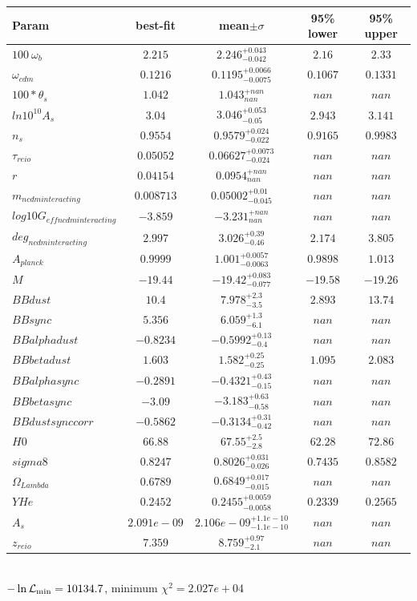 \begin{tabular}{|l|c|c|c|c|} 
 \hline 
Param & best-fit & mean$\pm\sigma$ & 95\% lower & 95\% upper \\ \hline 
$100~\omega{}_{b }$ &$2.215$ & $2.246_{-0.042}^{+0.043}$ & $2.16$ & $2.33$ \\ 
$\omega{}_{cdm }$ &$0.1216$ & $0.1195_{-0.0075}^{+0.0066}$ & $0.1067$ & $0.1331$ \\ 
$100*\theta{}_{s }$ &$1.042$ & $1.043_{nan}^{+nan}$ & $nan$ & $nan$ \\ 
$ln10^{10}A_{s }$ &$3.04$ & $3.046_{-0.05}^{+0.053}$ & $2.943$ & $3.141$ \\ 
$n_{s }$ &$0.9554$ & $0.9579_{-0.022}^{+0.024}$ & $0.9165$ & $0.9983$ \\ 
$\tau{}_{reio }$ &$0.05052$ & $0.06627_{-0.024}^{+0.0073}$ & $nan$ & $nan$ \\ 
$r$ &$0.04154$ & $0.0954_{nan}^{+nan}$ & $nan$ & $nan$ \\ 
$m_{ncdm interacting }$ &$0.008713$ & $0.05002_{-0.045}^{+0.01}$ & $nan$ & $nan$ \\ 
$log10G_{eff ncdm interacting }$ &$-3.859$ & $-3.231_{nan}^{+nan}$ & $nan$ & $nan$ \\ 
$deg_{ncdm interacting }$ &$2.997$ & $3.026_{-0.46}^{+0.39}$ & $2.174$ & $3.805$ \\ 
$A_{planck }$ &$0.9999$ & $1.001_{-0.0063}^{+0.0057}$ & $0.9898$ & $1.013$ \\ 
$M$ &$-19.44$ & $-19.42_{-0.077}^{+0.083}$ & $-19.58$ & $-19.26$ \\ 
$BBdust$ &$10.4$ & $7.978_{-3.5}^{+2.3}$ & $2.893$ & $13.74$ \\ 
$BBsync$ &$5.356$ & $6.059_{-6.1}^{+1.3}$ & $nan$ & $nan$ \\ 
$BBalphadust$ &$-0.8234$ & $-0.5992_{-0.4}^{+0.13}$ & $nan$ & $nan$ \\ 
$BBbetadust$ &$1.603$ & $1.582_{-0.25}^{+0.25}$ & $1.095$ & $2.083$ \\ 
$BBalphasync$ &$-0.2891$ & $-0.4321_{-0.15}^{+0.43}$ & $nan$ & $nan$ \\ 
$BBbetasync$ &$-3.09$ & $-3.183_{-0.58}^{+0.63}$ & $nan$ & $nan$ \\ 
$BBdustsynccorr$ &$-0.5862$ & $-0.3134_{-0.42}^{+0.31}$ & $nan$ & $nan$ \\ 
$H0$ &$66.88$ & $67.55_{-2.8}^{+2.5}$ & $62.28$ & $72.86$ \\ 
$sigma8$ &$0.8247$ & $0.8026_{-0.026}^{+0.031}$ & $0.7435$ & $0.8582$ \\ 
$\Omega{}_{Lambda }$ &$0.6789$ & $0.6849_{-0.015}^{+0.017}$ & $nan$ & $nan$ \\ 
$YHe$ &$0.2452$ & $0.2455_{-0.0058}^{+0.0059}$ & $0.2339$ & $0.2565$ \\ 
$A_{s }$ &$2.091e-09$ & $2.106e-09_{-1.1e-10}^{+1.1e-10}$ & $nan$ & $nan$ \\ 
$z_{reio }$ &$7.359$ & $8.759_{-2.1}^{+0.97}$ & $nan$ & $nan$ \\ 
\hline 
 \end{tabular} \\ 
$-\ln{\cal L}_\mathrm{min} =10134.7$, minimum $\chi^2=2.027e+04$ \\ 
